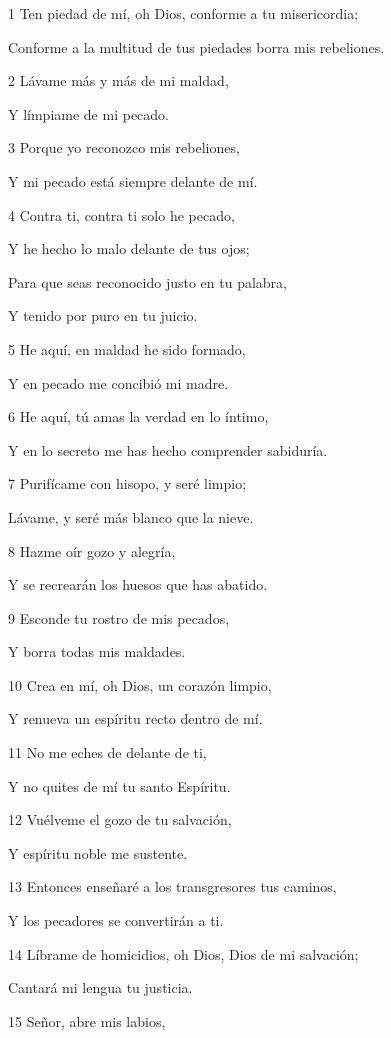 \par 1 Ten piedad de mí, oh Dios, conforme a tu misericordia;
\par Conforme a la multitud de tus piedades borra mis rebeliones.
\par 2 Lávame más y más de mi maldad,
\par Y límpiame de mi pecado.
\par 3 Porque yo reconozco mis rebeliones,
\par Y mi pecado está siempre delante de mí.
\par 4 Contra ti, contra ti solo he pecado,
\par Y he hecho lo malo delante de tus ojos;
\par Para que seas reconocido justo en tu palabra,
\par Y tenido por puro en tu juicio.
\par 5 He aquí, en maldad he sido formado,
\par Y en pecado me concibió mi madre.
\par 6 He aquí, tú amas la verdad en lo íntimo,
\par Y en lo secreto me has hecho comprender sabiduría.
\par 7 Purifícame con hisopo, y seré limpio;
\par Lávame, y seré más blanco que la nieve.
\par 8 Hazme oír gozo y alegría,
\par Y se recrearán los huesos que has abatido.
\par 9 Esconde tu rostro de mis pecados,
\par Y borra todas mis maldades.
\par 10 Crea en mí, oh Dios, un corazón limpio,
\par Y renueva un espíritu recto dentro de mí.
\par 11 No me eches de delante de ti,
\par Y no quites de mí tu santo Espíritu.
\par 12 Vuélveme el gozo de tu salvación,
\par Y espíritu noble me sustente.
\par 13 Entonces enseñaré a los transgresores tus caminos,
\par Y los pecadores se convertirán a ti.
\par 14 Líbrame de homicidios, oh Dios, Dios de mi salvación;
\par Cantará mi lengua tu justicia.
\par 15 Señor, abre mis labios,

